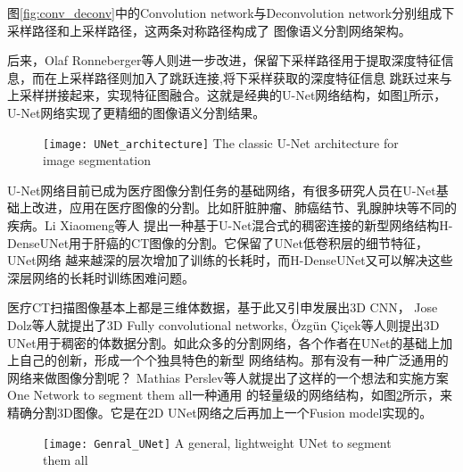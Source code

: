 	图\ref{fig:conv_deconv}中的Convolution network与Deconvolution network分别组成下采样路径和上采样路径，这两条对称路径构成了
	图像语义分割网络架构。
	
	后来，Olaf Ronneberger等人\cite{ronneberger2015u}则进一步改进，保留下采样路径用于提取深度特征信息，而在上采样路径则加入了跳跃连接,将下采样获取的深度特征信息
	跳跃过来与上采样拼接起来，实现特征图融合。这就是经典的U-Net网络结构，如图\ref{fig:UNet}所示，U-Net网络实现了更精细的图像语义分割结果。
	
	\begin{figure}[!htp]
		\centering
		\texttt{[image: UNet\_architecture]}
			{The classic U-Net architecture for image segmentation}
		\label{fig:UNet}
	\end{figure}
	
	U-Net网络目前已成为医疗图像分割任务的基础网络，有很多研究人员在U-Net基础上改进，应用在医疗图像的分割。比如肝脏肿瘤、肺癌结节、乳腺肿块等不同的疾病。Li Xiaomeng等人
	\cite{Li2017HDenseUNetHD}提出一种基于U-Net混合式的稠密连接的新型网络结构H-DenseUNet用于肝癌的CT图像的分割。它保留了UNet低卷积层的细节特征，UNet网络
	越来越深的层次增加了训练的长耗时，而H-DenseUNet又可以解决这些深层网络的长耗时训练困难问题。
	
	医疗CT扫描图像基本上都是三维体数据，基于此又引申发展出3D CNN， Jose Dolz等人\cite{Dolze3DFCN}就提出了3D Fully convolutional networks, {\"O}zg{\"u}n {\c{C}}i{\c{c}}ek等人\cite{cciccek20163d}则提出3D UNet用于稠密的体数据分割。如此众多的分割网络，各个作者在UNet的基础上加上自己的创新，形成一个个独具特色的新型
	网络结构。那有没有一种广泛通用的网络来做图像分割呢？ Mathias Perslev等人\cite{PerslevGeneralUNetFusion}就提出了这样的一个想法和实施方案
	One Network to segment them all一种通用	的轻量级的网络结构，如图\ref{fig:Genral_UNet}所示，来精确分割3D图像。它是在2D UNet网络之后再加上一个Fusion model实现的。
	\begin{figure}[!htp]
		\centering
		\texttt{[image: Genral\_UNet]}
			{A general, lightweight UNet to segment them all}
		\label{fig:Genral_UNet}
	\end{figure}
	
